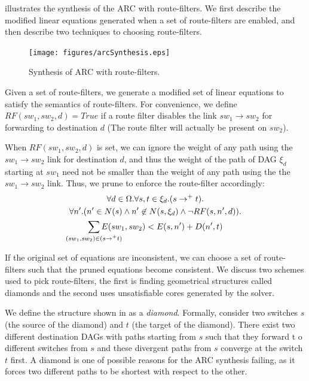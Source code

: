  illustrates the synthesis of 
the ARC with route-filters. We first describe the 
modified linear equations generated when a set of
route-filters are enabled, and then describe two
techniques to choosing route-filters. 
\begin{figure}
	\centering
	\texttt{[image: figures/arcSynthesis.eps]}
	\caption{Synthesis of ARC with route-filters.} \label{fig:arcSynthesis}
\end{figure}

Given a set of route-filters, we generate a modified 
set of linear equations to satisfy the 
semantics of route-filters.
For convenience, we define $RF(sw_1, sw_2, d) = True$ 
if a route filter disables the link $sw_1 \rightarrow sw_2$
for forwarding to destination $d$ (The route filter will
actually be present on $sw_2$). 

When $RF(sw_1, sw_2, d)$ is set, we can ignore the 
weight of any path using the $sw_1 \rightarrow sw_2$
link for destination $d$, and thus 
the weight of the path of DAG $\xi_d$
starting at $sw_1$ need not be smaller than the weight
of any path
using the the $sw_1 \rightarrow sw_2$ link. Thus,
we prune  to enforce the route-filter accordingly:
\begin{multline} \label{eq:uniq}
		\forall d \in \Omega. \forall s, t \in \xi_d. (s \rightarrow^+ t).\\ 
		\forall n'. (n' \in N(s) \wedge n' \not\in N(s, \xi_d) \wedge \neg RF(s,n',d)). \\
		\sum_{\mathclap{\substack{(sw_1, sw_2) \in (s \rightarrow^+ t)}}} 
		E(sw_1, sw_2) < E(s, n') + D(n', t)   
\end{multline}

If the original set of equations are inconsistent, we 
can choose a set of route-filters such that the pruned
equations become consistent. 
We discuss two schemes used to pick route-filters,
the first is finding geometrical structures called diamonds 
and the second uses unsatisfiable cores generated
by the solver.

We define the structure shown in 
as a \emph{diamond}. Formally,
consider two switches $s$ (the source of the diamond) 
and $t$ (the target of the diamond).
There exist two different destination DAGs with 
paths starting from $s$ such that they forward t
o different switches from $s$  
and these divergent paths from $s$ converge
at the switch $t$ first. A diamond is 
one of possible reasons for the ARC synthesis 
failing, as it forces two different paths to be 
shortest with respect to the other. 

